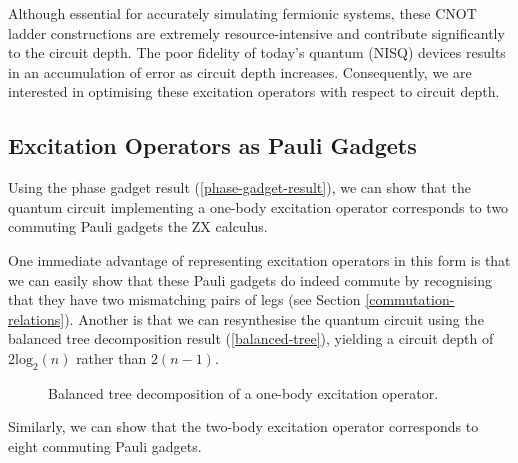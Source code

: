 Although essential for accurately simulating fermionic systems, these CNOT ladder constructions are extremely resource-intensive and contribute significantly to the circuit depth. The poor fidelity of today's quantum (NISQ) devices results in an accumulation of error as circuit depth increases. Consequently, we are interested in optimising these excitation operators with respect to circuit depth.

\subsection{Excitation Operators as Pauli Gadgets}%
\label{excitation-operators-pauli-gadgets}

Using the phase gadget result (\ref{phase-gadget-result}), we can show that the quantum circuit implementing a one-body excitation operator corresponds to two commuting Pauli gadgets the ZX calculus.


One immediate advantage of representing excitation operators in this form is that we can easily show that these Pauli gadgets do indeed commute by recognising that they have two mismatching pairs of legs (see Section \ref{commutation-relations}). Another is that we can resynthesise the quantum circuit using the balanced tree decomposition result (\ref{balanced-tree}), yielding a circuit depth of $2\text{log}_2(n)$ rather than $2(n-1)$.

\begin{figure}[H]
    \centering
    \caption{Balanced tree decomposition of a one-body excitation operator.}
\end{figure}

Similarly, we can show that the two-body excitation operator corresponds to eight commuting Pauli gadgets.

